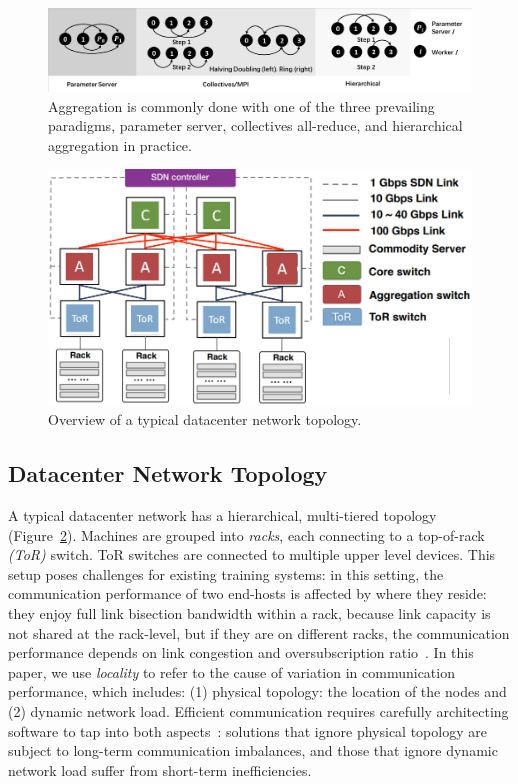 \begin{figure}[t!]
	\centering
	\includegraphics[width=\linewidth, trim=2 3 3 3,clip]{Figures/aggregationapproaches.pdf}
	\caption{Aggregation is commonly done with one of the three prevailing paradigms, parameter server, collectives all-reduce, and hierarchical aggregation in practice.}
	\label{fig:aggregationapproaches}
\end{figure}


\begin{figure}[t!]
	\centering
	\includegraphics[width=.6\linewidth, trim=2 3 3 3,clip]{Figures/dc.png}
	\caption{Overview of a typical datacenter network topology.}
	\label{fig:dc}
\end{figure}


\subsection{Datacenter Network Topology}
\label{sec:datacenternetwork}
A typical datacenter network has a hierarchical, multi-tiered topology~\cite{Mysore2009PortLandAS,VL2,Roy2015InsideTS,incbricks} (Figure~\ref{fig:dc}). Machines are grouped into \textit{racks}, each connecting to a top-of-rack \textit{(ToR)} switch. ToR switches are connected to multiple upper level devices. This setup poses challenges for existing training systems: in this setting, the communication performance of two end-hosts is affected by where they reside: they enjoy full link bisection bandwidth within a rack, because link capacity is not shared at the rack-level, but if they are on different racks, the communication performance depends on link congestion and oversubscription ratio~\cite{Bilal2012ACS}. In this paper, we use \textit{locality} to refer to the cause of variation in communication performance, which includes: (1) physical topology: the location of the nodes and (2) dynamic network load. Efficient communication requires carefully architecting software to tap into both aspects~\cite{eyeQ, 27Octobe15:online}: solutions that ignore physical topology are subject to long-term communication imbalances, and those that ignore dynamic network load suffer from short-term inefficiencies.

